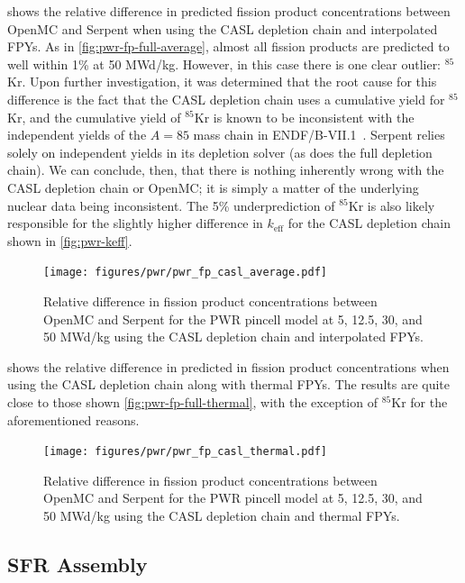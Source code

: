 \documentclass[3p,authoryear]{elsarticle}
\begin{document}
 shows the relative difference in predicted
fission product concentrations between OpenMC and Serpent when using the CASL
depletion chain and interpolated FPYs. As in \cref{fig:pwr-fp-full-average},
almost all fission products are predicted to well within 1\% at 50 MWd/kg.
However, in this case there is one clear outlier: $^{85}$Kr. Upon further
investigation, it was determined that the root cause for this difference is the
fact that the CASL depletion chain uses a cumulative yield for $^{85}$Kr, and
the cumulative yield of $^{85}$Kr is known to be inconsistent with the
independent yields of the $A=85$ mass chain in
ENDF/B-VII.1~\citep{pigni2015nds}. Serpent relies solely on independent yields
in its depletion solver (as does the full depletion chain). We can conclude,
then, that there is nothing inherently wrong with the CASL depletion chain or
OpenMC; it is simply a matter of the underlying nuclear data being inconsistent.
The 5\% underprediction of $^{85}$Kr is also likely responsible for the slightly
higher difference in $k_\text{eff}$ for the CASL depletion chain shown in
\cref{fig:pwr-keff}.
\begin{figure}[H]
  \centering
  \texttt{[image: figures/pwr/pwr\_fp\_casl\_average.pdf]}
  \caption{Relative difference in fission product concentrations between OpenMC
  and Serpent for the PWR pincell model at 5, 12.5, 30, and 50 MWd/kg using the
  CASL depletion chain and interpolated FPYs.}
  \label{fig:pwr-fp-casl-average}
\end{figure}

 shows the relative difference in predicted in
fission product concentrations when using the CASL depletion chain along with
thermal FPYs. The results are quite close to those shown
\cref{fig:pwr-fp-full-thermal}, with the exception of $^{85}$Kr for the
aforementioned reasons.
\begin{figure}[H]
  \centering
  \texttt{[image: figures/pwr/pwr\_fp\_casl\_thermal.pdf]}
  \caption{Relative difference in fission product concentrations between OpenMC
  and Serpent for the PWR pincell model at 5, 12.5, 30, and 50 MWd/kg using the
  CASL depletion chain and thermal FPYs.}
  \label{fig:pwr-fp-casl-thermal}
\end{figure}

\subsection{SFR Assembly}
\end{document}
